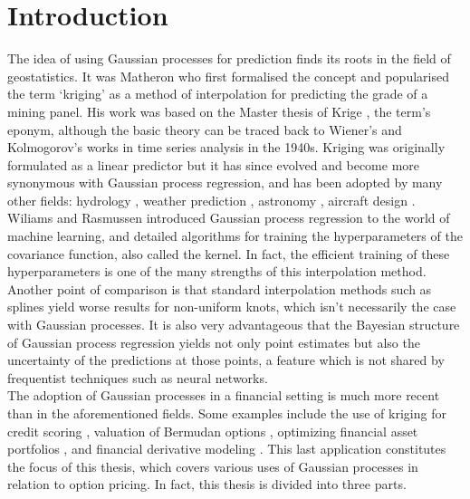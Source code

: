 \documentclass[a4paper,12pt]{article}
\begin{document}
\newpage
\setcounter{tocdepth}{2}
\tableofcontents

\newpage

\setcounter{page}{1}

\section{Introduction}
The idea of using Gaussian processes for prediction finds its roots in the field of geostatistics. It was Matheron \cite{Matheron1963} who first formalised the concept and popularised the term `kriging' as a method of interpolation for predicting the grade of a mining panel. His work was based on the Master thesis of Krige \cite{Krige2015}, the term's eponym, although the basic theory can be traced back to Wiener's \cite{Wiener1949} and Kolmogorov's \cite{Kolmogorov1941} works in time series analysis in the 1940s. Kriging was originally formulated as a linear predictor but it has since evolved and become more synonymous with Gaussian process regression, and has been adopted by many other fields: hydrology \cite{Zimmerman1998}, weather prediction \cite{Karnieli1990}, astronomy \cite{Pastorello2014}, aircraft design \cite{Chung2002}.\\
Wiliams and Rasmussen \cite{Williams1996} introduced Gaussian process regression to the world of machine learning, and detailed algorithms for training the hyperparameters of the covariance function, also called the kernel. In fact, the efficient training of these hyperparameters is one of the many strengths of this interpolation method. Another point of comparison is that standard interpolation methods such as splines yield worse results for non-uniform knots, which isn't necessarily the case with Gaussian processes. It is also very advantageous that the Bayesian structure of Gaussian process regression yields not only point estimates but also the uncertainty of the predictions at those points, a feature which is not shared by frequentist techniques such as neural networks.\\
The adoption of Gaussian processes in a financial setting is much more recent than in the aforementioned fields. Some examples include the use of kriging for credit scoring \cite{Fernandes2016}, valuation of Bermudan options \cite{ludkovski2016}, optimizing financial asset portfolios \cite{Barrosa2016}, and financial derivative modeling \cite{Cousin2016}. This last application constitutes the focus of this thesis, which covers various uses of Gaussian processes in relation to option pricing. In fact, this thesis is divided into three parts.\\
\end{document}
